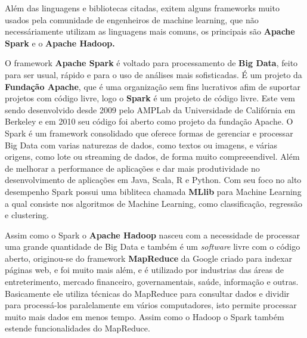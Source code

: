\begin{figure}[h!]
	\centering
\end{figure}

Além das linguagens e bibliotecas citadas, exitem alguns frameworks muito usados pela comunidade de engenheiros de machine learning, 
que não necessáriamente utilizam as linguagens mais comuns, os principais são \textbf{Apache Spark} e o \textbf{Apache Hadoop.}

O framework \textbf{Apache Spark} é voltado para processamento de \textbf{Big Data}, feito para ser usual, rápido e para o uso de análises mais
sofisticadas. É um projeto da \textbf{Fundação Apache}, que é uma organização sem fins lucrativos afim de suportar 
projetos com código livre, logo o \textbf{Spark} é um projeto de código livre. Este vem sendo desenvolvido desde 2009 pelo 
AMPLab da Universidade de Califórnia em Berkeley e em 2010 seu código foi aberto como projeto da fundação Apache. 
O Spark é um framework consolidado que oferece formas de gerenciar e processar Big Data com varias naturezas de dados, como textos ou imagens, e várias origens,  
como lote ou streaming de dados,  de forma muito compreeendivel. 
Além de melhorar a performance de aplicações e dar mais produtividade no desenvolvimento
de aplicações em Java, Scala, R e Python. Com seu foco no alto desempenho Spark possui uma bibliteca chamada \textbf{MLlib} para Machine Learning a qual 
consiste nos algoritmos de Machine Learning, como classificação, regressão e clustering.

Assim como o Spark o \textbf{Apache Hadoop} nasceu com a necessidade de processar uma grande quantidade de Big Data e também é um \textit{software} 
livre com o código aberto, originou-se do framework \textbf{MapReduce} da Google criado para indexar páginas web, e foi muito mais além,  
e é utilizado por industrias das áreas de entreterimento, mercado financeiro, governamentais, saúde, informação e outras. Basicamente ele utiliza
técnicas do MapReduce para consultar dados e dividir para processá-los paralelamente em vários computadores, isto permite processar muito mais dados em menos
tempo. Assim como o Hadoop o Spark também estende funcionalidades do MapReduce.
 

